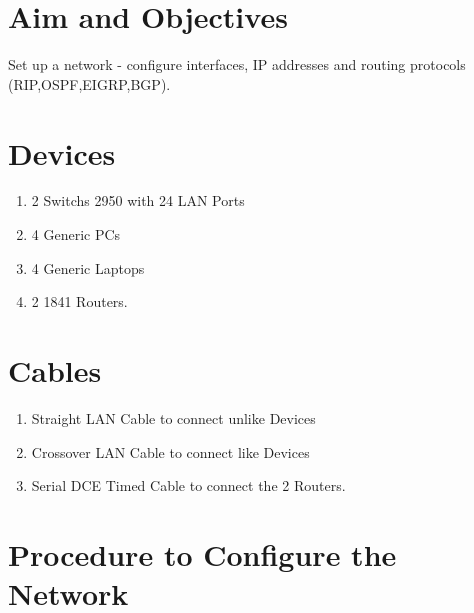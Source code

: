 \documentclass[11pt]{article}
\begin{document}
	
\tableofcontents
\thispagestyle{empty}
\clearpage


\setcounter{page}{1}

\section{Aim and Objectives}
Set up a network - configure interfaces, IP addresses and routing protocols (RIP,OSPF,EIGRP,BGP).

\section{Devices}

\begin{enumerate}
	\item 2 Switchs 2950 with 24 LAN Ports
	\item 4 Generic PCs
	\item 4 Generic Laptops
	\item 2 1841 Routers.
\end{enumerate}

\section{Cables}
\begin{enumerate}
	\item Straight LAN Cable to connect unlike Devices
	\item Crossover LAN Cable to connect like Devices
	\item Serial DCE Timed Cable to connect the 2 Routers. 
\end{enumerate}

\section{Procedure to Configure the Network}
\end{document}
